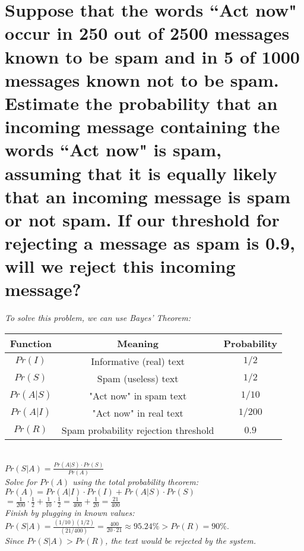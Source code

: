 \documentclass{article}
\begin{document}

\section{Suppose that the words ``Act now" occur in 250 out of 2500 messages known to be spam
    and in 5 of 1000 messages known not to be spam. Estimate the probability that an
    incoming message containing the words ``Act now" is spam, assuming that it is equally
    likely that an incoming message is spam or not spam. If our threshold for rejecting
    a message as spam is 0.9, will we reject this incoming message? \\}
\hspace{1cm}\textit{To solve this problem, we can use Bayes' Theorem:}
\begin{center}
    \begin{tabular}{c|c|c}
        Function & Meaning & Probability \\
        \hline
        $Pr(I)$ & Informative (real) text & $1/2$ \\
        $Pr(S)$ & Spam (useless) text & $1/2$ \\
        \hline
        $Pr(A|S)$ & "Act now" in spam text & $1/10$ \\
        $Pr(A|I)$ & "Act now" in real text & $1/200$ \\
        \hline
        $Pr(R)$ & Spam probability rejection threshold & $0.9$ \\
    \end{tabular} \\
    \vspace{0.25cm}
    $Pr(S|A) = \frac{Pr(A|S)\cdot Pr(S)}{Pr(A)}$ \\
    \vspace{0.25cm}
    \textit{Solve for $Pr(A)$ using the total probability theorem:} \\
    \vspace{0.25cm}
    $Pr(A) = Pr(A|I)\cdot Pr(I) + Pr(A|S)\cdot Pr(S)$ \\
    \vspace{0.25cm}
    $ = \frac{1}{200}\cdot \frac{1}{2} + \frac{1}{10}\cdot \frac{1}{2} = 
    \frac{1}{400} + \frac{1}{20} = \frac{21}{400}$ \\
    \vspace{0.25cm}
    \textit{Finish by plugging in known values:} \\
    \vspace{0.25cm}
    $ Pr(S|A) = \frac{(1/10)(1/2)}{(21/400)} = \frac{400}{20\cdot 21} 
        \approx 95.24\% > Pr(R) = 90\%$. \\
    \vspace{0.25cm}
    \textit{Since $Pr(S|A) > Pr(R)$, the text would be rejected by the system.}
\end{center}
\clearpage
\end{document}
